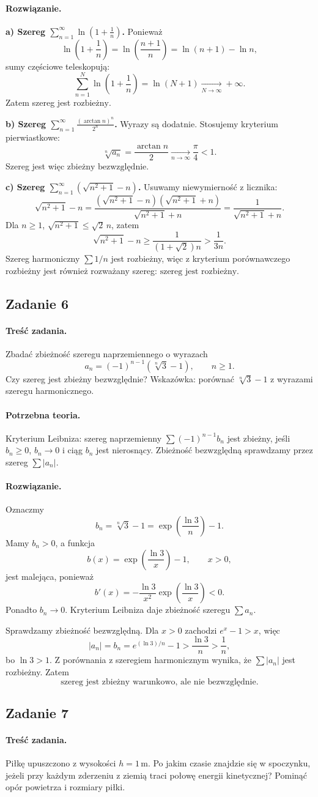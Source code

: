 \documentclass[12pt,a4paper]{article}
\numberwithin{equation}{section}
\newcommand{\zadanie}[1]{\subsection*{Zadanie #1}}
\newcommand{\tresc}{\paragraph{Treść zadania.}}
\newcommand{\teoria}{\paragraph{Potrzebna teoria.}}
\newcommand{\rozw}{\paragraph{Rozwiązanie.}}
\begin{document}
\rozw
\textbf{a) Szereg \(\displaystyle\sum_{n=1}^{\infty}
\ln\left(1+\frac1n\right)\).}
Ponieważ
\[
  \ln\left(1+\frac1n\right)
  =\ln\left(\frac{n+1}{n}\right)=\ln(n+1)-\ln n,
\]
sumy częściowe teleskopują:
\[
  \sum_{n=1}^{N}\ln\left(1+\frac1n\right)
  =\ln(N+1)\xrightarrow[N\to\infty]{}+\infty.
\]
Zatem szereg jest \(\boxed{\text{rozbieżny}}\).

\medskip
\textbf{b) Szereg \(\displaystyle\sum_{n=1}^{\infty}
\frac{(\arctan n)^n}{2^n}\).}
Wyrazy są dodatnie. Stosujemy kryterium pierwiastkowe:
\[
  \sqrt[n]{a_n}=\frac{\arctan n}{2}
  \xrightarrow[n\to\infty]{}\frac{\pi}{4}<1.
\]
Szereg jest więc \(\boxed{\text{zbieżny bezwzględnie}}\).

\medskip
\textbf{c) Szereg \(\displaystyle\sum_{n=1}^{\infty}
\left(\sqrt{n^2+1}-n\right)\).}
Usuwamy niewymierność z licznika:
\[
  \sqrt{n^2+1}-n
  =\frac{(\sqrt{n^2+1}-n)(\sqrt{n^2+1}+n)}
          {\sqrt{n^2+1}+n}
  =\frac{1}{\sqrt{n^2+1}+n}.
\]
Dla \(n\geq1\), \(\sqrt{n^2+1}\leq\sqrt{2}\,n\), zatem
\[
  \sqrt{n^2+1}-n
  \geq \frac{1}{(1+\sqrt{2})n}
  >\frac{1}{3n}.
\]
Szereg harmoniczny \(\sum 1/n\) jest rozbieżny, więc z kryterium
porównawczego rozbieżny jest również rozważany szereg:
\(\boxed{\text{szereg jest rozbieżny}}\).

\zadanie{6}
\tresc
Zbadać zbieżność szeregu naprzemiennego o wyrazach
\[
  a_n=(-1)^{n-1}\left(\sqrt[n]{3}-1\right),
  \qquad n\geq1.
\]
Czy szereg jest zbieżny bezwzględnie? Wskazówka: porównać
\(\sqrt[n]{3}-1\) z wyrazami szeregu harmonicznego.

\teoria
Kryterium Leibniza: szereg naprzemienny
\(\sum(-1)^{n-1}b_n\) jest zbieżny, jeśli \(b_n\geq0\), \(b_n\to0\)
i ciąg \(b_n\) jest nierosnący. Zbieżność bezwzględną
sprawdzamy przez szereg \(\sum |a_n|\).

\rozw
Oznaczmy
\[
  b_n=\sqrt[n]{3}-1
      =\exp\left(\frac{\ln 3}{n}\right)-1.
\]
Mamy \(b_n>0\), a funkcja
\[
  b(x)=\exp\left(\frac{\ln 3}{x}\right)-1,\qquad x>0,
\]
jest malejąca, ponieważ
\[
  b'(x)=-\frac{\ln 3}{x^2}
         \exp\left(\frac{\ln 3}{x}\right)<0.
\]
Ponadto \(b_n\to0\). Kryterium Leibniza daje zbieżność szeregu
\(\sum a_n\).

Sprawdzamy zbieżność bezwzględną. Dla \(x>0\) zachodzi
\(e^x-1>x\), więc
\[
  |a_n|=b_n
  =e^{(\ln3)/n}-1
  >\frac{\ln3}{n}
  >\frac1n,
\]
bo \(\ln3>1\). Z porównania z szeregiem harmonicznym wynika, że
\(\sum |a_n|\) jest rozbieżny. Zatem
\[
  \boxed{\text{szereg jest zbieżny warunkowo, ale nie bezwzględnie}.}
\]

\zadanie{7}
\tresc
Piłkę upuszczono z wysokości \(h=1\,\mathrm{m}\). Po jakim czasie
znajdzie się w spoczynku, jeżeli przy każdym zderzeniu z ziemią traci
połowę energii kinetycznej? Pominąć opór powietrza i rozmiary piłki.
\end{document}
